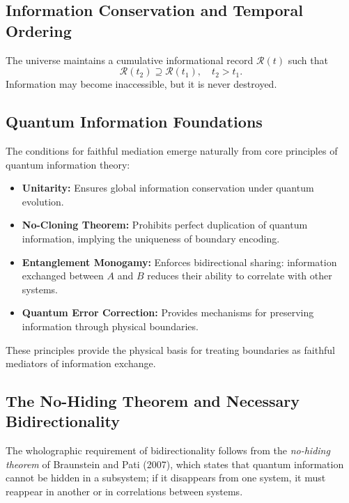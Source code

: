 ﻿\documentclass[12pt]{article}
\begin{document}
\subsection{Information Conservation and Temporal Ordering}


\begin{assumption}
The universe maintains a cumulative informational record $\mathcal{R}(t)$ such that
\begin{equation}
    \mathcal{R}(t_2) \supseteq \mathcal{R}(t_1), \quad t_2 > t_1.
\end{equation}
Information may become inaccessible, but it is never destroyed.
\end{assumption}


\subsection{Quantum Information Foundations}


The conditions for faithful mediation emerge naturally from core principles of quantum information theory:
\begin{itemize}
    \item \textbf{Unitarity:} Ensures global information conservation under quantum evolution.
    \item \textbf{No-Cloning Theorem:} Prohibits perfect duplication of quantum information, implying the uniqueness of boundary encoding.
    \item \textbf{Entanglement Monogamy:} Enforces bidirectional sharing: information exchanged between $A$ and $B$ reduces their ability to correlate with other systems.
    \item \textbf{Quantum Error Correction:} Provides mechanisms for preserving information through physical boundaries.
\end{itemize}
These principles provide the physical basis for treating boundaries as faithful mediators of information exchange.


\subsection{The No-Hiding Theorem and Necessary Bidirectionality}


The wholographic requirement of bidirectionality follows from the \emph{no-hiding theorem} of Braunstein and Pati (2007), which states that quantum information cannot be hidden in a subsystem; if it disappears from one system, it must reappear in another or in correlations between systems.
\end{document}
